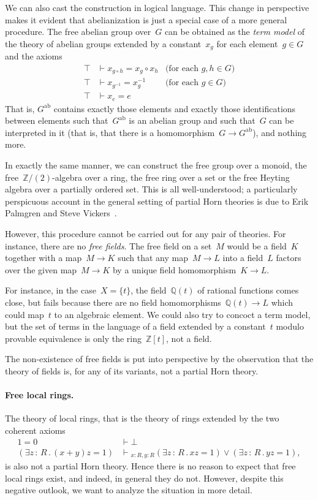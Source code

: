 \documentclass{ws-rv9x6}
\newcommand{\QQ}{\mathbb{Q}}
\newcommand{\ZZ}{\mathbb{Z}}
\newcommand{\ab}{\mathrm{ab}}
\renewcommand{\_}{\mathpunct{.}}
\newcommand{\?}{\,{:}\,}
\newcommand{\seq}[1]{\mathrel{\vdash\!\!\!_{#1}}}
\begin{document}
We can also cast the construction in logical language. This change in perspective makes it evident
that abelianization is just a special case of a more general procedure.
The free abelian group over~$G$ can be obtained as the \emph{term model} of the
theory of abelian groups extended by a constant~$x_g$ for each element~$g \in
G$ and the axioms
\begin{align*}
  \top &\vdash x_{g \circ h} = x_g \circ x_h & \text{(for each~$g,h \in G$)} \\
  \top &\vdash x_{g^{-1}} = x_g^{-1} & \text{(for each~$g \in G$)} \\
  \top &\vdash x_e = e
\end{align*}
That is, $G^\ab$ contains exactly those elements and exactly those
identifications between elements such that~$G^\ab$ is an abelian group and such
that~$G$ can be interpreted in it (that is, that there is a homomorphism~$G \to
G^\ab$), and nothing more.

In exactly the same manner, we can construct the free group over a monoid, the
free~$\ZZ/(2)$-algebra over a ring, the free ring over a set or the free
Heyting algebra over a partially ordered set. This is all well-understood; a
particularly perspicuous account in the general setting of partial Horn
theories is due to Erik Palmgren and Steve Vickers~\cite[Section~5]{palmgren-vickers:partial-horn}.

However, this procedure cannot be carried out for any pair of theories. For
instance, there are no \emph{free fields}. The free field on a set~$M$ would be
a field~$K$ together with a map~$M \to K$ such that any map~$M \to L$ into a field~$L$ factors
over the given map~$M \to K$ by a unique field homomorphism~$K \to L$.

For instance, in the case~$X = \{ t \}$, the field~$\QQ(t)$ of rational
functions comes close, but fails because there are no field homomorphisms~$\QQ(t)
\to L$ which could map~$t$ to an algebraic element. We could also try to
concoct a term model, but the set of terms in the language of a field extended
by a constant~$t$ modulo provable equivalence is only the ring~$\ZZ[t]$, not a
field.

The non-existence of free fields is put into perspective by the observation that the
theory of fields is, for any of its variants, not a partial Horn theory.

\paragraph{Free local rings.} The theory of local rings, that is the theory of
rings extended by the two coherent axioms
\begin{align*}
  1 = 0 &\vdash \bot \\
  (\exists z\?R\_ (x+y)z = 1) &\seq{x:R,y:R} (\exists z\?R\_ xz = 1) \vee
  (\exists z\?R\_ yz = 1),
\end{align*}
is also not a partial Horn theory. Hence there is no reason to expect that free
local rings exist, and indeed, in general they do not. However, despite this
negative outlook, we want to analyze the situation in more detail.
\end{document}
